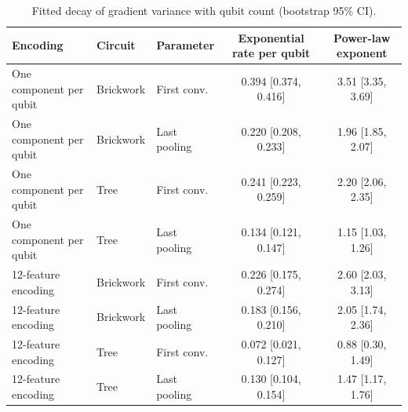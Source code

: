\begin{table}[tbp]
\centering
\caption{Fitted decay of gradient variance with qubit count (bootstrap 95\% CI).}
\label{tab:s_gradvar_fits}
\small
\begin{tabular}{lllcc}
\toprule
Encoding & Circuit & Parameter & Exponential rate per qubit & Power-law exponent \\
\midrule
One component per qubit & Brickwork & First conv. & \num{0.394} [\num{0.374}, \num{0.416}] & \num{3.51} [\num{3.35}, \num{3.69}] \\
One component per qubit & Brickwork & Last pooling & \num{0.220} [\num{0.208}, \num{0.233}] & \num{1.96} [\num{1.85}, \num{2.07}] \\
One component per qubit & Tree & First conv. & \num{0.241} [\num{0.223}, \num{0.259}] & \num{2.20} [\num{2.06}, \num{2.35}] \\
One component per qubit & Tree & Last pooling & \num{0.134} [\num{0.121}, \num{0.147}] & \num{1.15} [\num{1.03}, \num{1.26}] \\
12-feature encoding & Brickwork & First conv. & \num{0.226} [\num{0.175}, \num{0.274}] & \num{2.60} [\num{2.03}, \num{3.13}] \\
12-feature encoding & Brickwork & Last pooling & \num{0.183} [\num{0.156}, \num{0.210}] & \num{2.05} [\num{1.74}, \num{2.36}] \\
12-feature encoding & Tree & First conv. & \num{0.072} [\num{0.021}, \num{0.127}] & \num{0.88} [\num{0.30}, \num{1.49}] \\
12-feature encoding & Tree & Last pooling & \num{0.130} [\num{0.104}, \num{0.154}] & \num{1.47} [\num{1.17}, \num{1.76}] \\
\bottomrule
\end{tabular}
\end{table}
